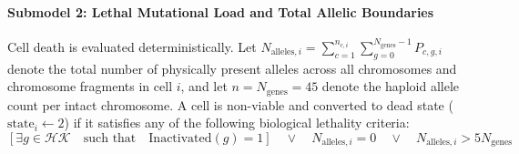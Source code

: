 \documentclass[11pt,a4paper]{article}
\begin{document}
\paragraph{Submodel 2: Lethal Mutational Load and Total Allelic Boundaries}
Cell death is evaluated deterministically. Let $N_{\text{alleles}, i} = \sum_{c=1}^{n_{c, i}} \sum_{g=0}^{N_{\text{genes}}-1} P_{c, g, i}$ denote the total number of physically present alleles across all chromosomes and chromosome fragments in cell $i$, and let $n = N_{\text{genes}} = 45$ denote the haploid allele count per intact chromosome. A cell is non-viable and converted to dead state ($\text{state}_i \leftarrow 2$) if it satisfies any of the following biological lethality criteria:
\begin{equation}
    \left[ \exists g \in \mathcal{HK} \quad \text{such that} \quad \text{Inactivated}(g) = 1 \right] \quad \lor \quad N_{\text{alleles}, i} = 0 \quad \lor \quad N_{\text{alleles}, i} > 5 N_{\text{genes}}
\end{equation}
\end{document}
